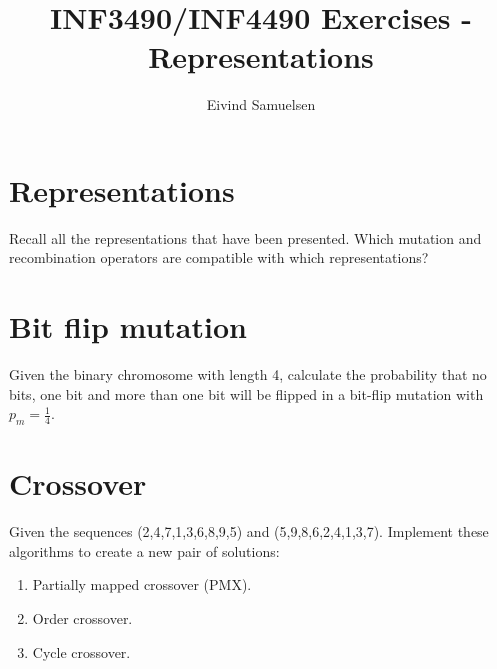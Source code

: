 
\title{\vspace{-2cm}INF3490/INF4490 Exercises - Representations}
\author{Eivind Samuelsen}
\date{}

\setlength\parindent{0pt}


    \renewcommand\marginsymbol[1][0pt]{%
  \tabto*{0cm}\makebox[-1cm][c]{$\mathbb{P}$}\tabto*{\TabPrevPos}}

\maketitle


\section{Representations}
Recall all the representations that have been presented.
Which mutation and recombination operators are compatible with which representations?

\section{Bit flip mutation}
Given the binary chromosome with length 4, calculate the probability that no bits,
one bit and more than one bit will be flipped in a bit-flip mutation with \(p_m = \frac{1}{4}\).

\section{Crossover \marginsymbol}
Given the sequences (2,4,7,1,3,6,8,9,5) and (5,9,8,6,2,4,1,3,7).
Implement these algorithms to create a new pair of solutions:
\renewcommand{\theenumi}{\alph{enumi}}
\begin{enumerate}
  \item Partially mapped crossover (PMX).
  \item Order crossover.
  \item Cycle crossover.
\end{enumerate}



